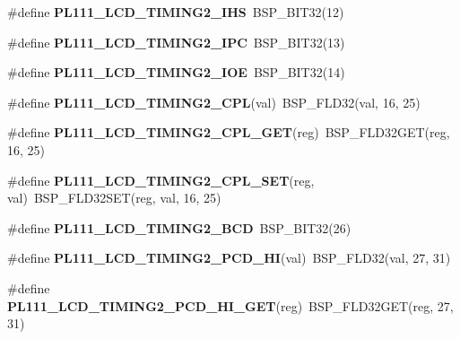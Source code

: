\begin{DoxyCompactItemize}
\mbox{\label{arm-pl111-regs_8h_abf98c0f75f8c3f39fde43568eeddce51}} 
\#define {\bfseries P\+L111\+\_\+\+L\+C\+D\+\_\+\+T\+I\+M\+I\+N\+G2\+\_\+\+I\+HS}~B\+S\+P\+\_\+\+B\+I\+T32(12)
\item 
\mbox{\label{arm-pl111-regs_8h_a5413a6b4d94ed7ee207d0d7bc4a3037b}} 
\#define {\bfseries P\+L111\+\_\+\+L\+C\+D\+\_\+\+T\+I\+M\+I\+N\+G2\+\_\+\+I\+PC}~B\+S\+P\+\_\+\+B\+I\+T32(13)
\item 
\mbox{\label{arm-pl111-regs_8h_a8059d977457eb2753e84f911d38373b1}} 
\#define {\bfseries P\+L111\+\_\+\+L\+C\+D\+\_\+\+T\+I\+M\+I\+N\+G2\+\_\+\+I\+OE}~B\+S\+P\+\_\+\+B\+I\+T32(14)
\item 
\mbox{\label{arm-pl111-regs_8h_a653e5c2f975e9b8e79d2c3e63970988e}} 
\#define {\bfseries P\+L111\+\_\+\+L\+C\+D\+\_\+\+T\+I\+M\+I\+N\+G2\+\_\+\+C\+PL}(val)~B\+S\+P\+\_\+\+F\+L\+D32(val, 16, 25)
\item 
\mbox{\label{arm-pl111-regs_8h_a6176ccc697a15e1ac19a7e6a067acb34}} 
\#define {\bfseries P\+L111\+\_\+\+L\+C\+D\+\_\+\+T\+I\+M\+I\+N\+G2\+\_\+\+C\+P\+L\+\_\+\+G\+ET}(reg)~B\+S\+P\+\_\+\+F\+L\+D32\+G\+ET(reg, 16, 25)
\item 
\mbox{\label{arm-pl111-regs_8h_a89181526280f82e01274230590964787}} 
\#define {\bfseries P\+L111\+\_\+\+L\+C\+D\+\_\+\+T\+I\+M\+I\+N\+G2\+\_\+\+C\+P\+L\+\_\+\+S\+ET}(reg,  val)~B\+S\+P\+\_\+\+F\+L\+D32\+S\+ET(reg, val, 16, 25)
\item 
\mbox{\label{arm-pl111-regs_8h_aaaa9831b59b20743a2f13da43936f769}} 
\#define {\bfseries P\+L111\+\_\+\+L\+C\+D\+\_\+\+T\+I\+M\+I\+N\+G2\+\_\+\+B\+CD}~B\+S\+P\+\_\+\+B\+I\+T32(26)
\item 
\mbox{\label{arm-pl111-regs_8h_a083b5b59376e0f7dee99e261a04da92a}} 
\#define {\bfseries P\+L111\+\_\+\+L\+C\+D\+\_\+\+T\+I\+M\+I\+N\+G2\+\_\+\+P\+C\+D\+\_\+\+HI}(val)~B\+S\+P\+\_\+\+F\+L\+D32(val, 27, 31)
\item 
\mbox{\label{arm-pl111-regs_8h_afbcc77ef89a73f0fde5d0b03ba106049}} 
\#define {\bfseries P\+L111\+\_\+\+L\+C\+D\+\_\+\+T\+I\+M\+I\+N\+G2\+\_\+\+P\+C\+D\+\_\+\+H\+I\+\_\+\+G\+ET}(reg)~B\+S\+P\+\_\+\+F\+L\+D32\+G\+ET(reg, 27, 31)

\end{DoxyCompactItemize}
